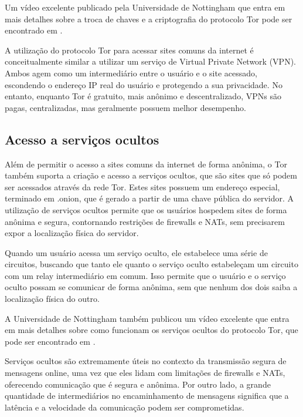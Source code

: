 Um vídeo excelente publicado pela Universidade de Nottingham que entra em mais detalhes sobre a troca de chaves e a criptografia do protocolo Tor pode ser encontrado em \cite{computerphile-tor}.

A utilização do protocolo Tor para acessar sites comuns da internet é conceitualmente similar a utilizar um serviço de Virtual Private Network (VPN). Ambos agem como um intermediário entre o usuário e o site acessado, escondendo o endereço IP real do usuário e protegendo a sua privacidade. No entanto, enquanto Tor é gratuito, mais anônimo e descentralizado, VPNs são pagas, centralizadas, mas geralmente possuem melhor desempenho.

\subsection{Acesso a serviços ocultos}

Além de permitir o acesso a sites comuns da internet de forma anônima, o Tor também suporta a criação e acesso a serviços ocultos, que são sites que só podem ser acessados através da rede Tor. Estes sites possuem um endereço especial, terminado em .onion, que é gerado a partir de uma chave pública do servidor. A utilização de serviços ocultos permite que os usuários hospedem sites de forma anônima e segura, contornando restrições de firewalls e NATs, sem precisarem expor a localização física do servidor.

Quando um usuário acessa um serviço oculto, ele estabelece uma série de circuitos, buscando que tanto ele quanto o serviço oculto estabeleçam um circuito com um relay intermediário em comum. Isso permite que o usuário e o serviço oculto possam se comunicar de forma anônima, sem que nenhum dos dois saiba a localização física do outro.

A Universidade de Nottingham também publicou um vídeo excelente que entra em mais detalhes sobre como funcionam os serviços ocultos do protocolo Tor, que pode ser encontrado em \cite{computerphile-hidden-services}.

Serviços ocultos são extremamente úteis no contexto da transmissão segura de mensagens online, uma vez que eles lidam com limitações de firewalls e NATs, oferecendo comunicação que é segura e anônima. Por outro lado, a grande quantidade de intermediários no encaminhamento de mensagens significa que a latência e a velocidade da comunicação podem ser comprometidas.